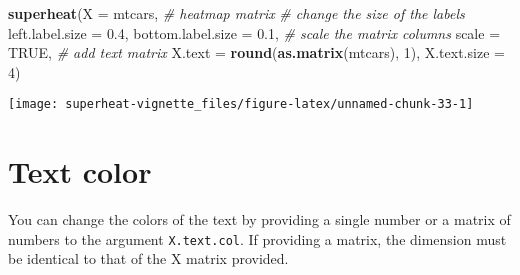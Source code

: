 \documentclass[]{book}
\newenvironment{Shaded}{\begin{snugshade}}{\end{snugshade}}
\newcommand{\KeywordTok}[1]{\textcolor[rgb]{0.13,0.29,0.53}{\textbf{{#1}}}}
\newcommand{\DataTypeTok}[1]{\textcolor[rgb]{0.13,0.29,0.53}{{#1}}}
\newcommand{\DecValTok}[1]{\textcolor[rgb]{0.00,0.00,0.81}{{#1}}}
\newcommand{\FloatTok}[1]{\textcolor[rgb]{0.00,0.00,0.81}{{#1}}}
\newcommand{\CommentTok}[1]{\textcolor[rgb]{0.56,0.35,0.01}{\textit{{#1}}}}
\newcommand{\OtherTok}[1]{\textcolor[rgb]{0.56,0.35,0.01}{{#1}}}
\newcommand{\NormalTok}[1]{{#1}}
\theoremstyle{definition}
\theoremstyle{definition}
\theoremstyle{remark}
\begin{document}
\begin{Shaded}
\begin{Highlighting}[]
\KeywordTok{superheat}\NormalTok{(}\DataTypeTok{X =} \NormalTok{mtcars, }\CommentTok{# heatmap matrix}
          \CommentTok{# change the size of the labels}
          \DataTypeTok{left.label.size =} \FloatTok{0.4}\NormalTok{,}
          \DataTypeTok{bottom.label.size =} \FloatTok{0.1}\NormalTok{,}
          \CommentTok{# scale the matrix columns}
          \DataTypeTok{scale =} \OtherTok{TRUE}\NormalTok{,}
          \CommentTok{# add text matrix}
          \DataTypeTok{X.text =} \KeywordTok{round}\NormalTok{(}\KeywordTok{as.matrix}\NormalTok{(mtcars), }\DecValTok{1}\NormalTok{),}
          \DataTypeTok{X.text.size =} \DecValTok{4}\NormalTok{)}
\end{Highlighting}
\end{Shaded}

\begin{center}\texttt{[image: superheat-vignette\_files/figure-latex/unnamed-chunk-33-1]} \end{center}

\section{Text color}\label{text-color}

You can change the colors of the text by providing a single number or a
matrix of numbers to the argument \texttt{X.text.col}. If providing a
matrix, the dimension must be identical to that of the X matrix
provided.
\end{document}
